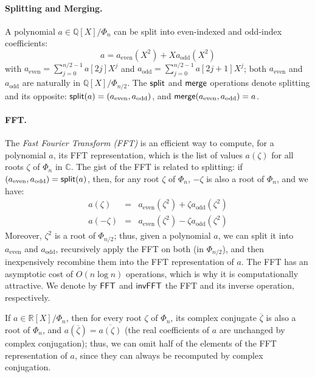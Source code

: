 \documentclass{llncs}
\newcommand{\bR}{\mathbb{R}}
\newcommand{\bQ}{\mathbb{Q}}
\newcommand{\bC}{\mathbb{C}}
\newcommand{\cconj}[1]{\overline{#1}}
\begin{document}
\paragraph{Splitting and Merging.}
A polynomial $a \in \bQ[X]/\Phi_n$ can be split into even-indexed and
odd-index coefficients:
\begin{equation*}
    a = a_{\text{even}}(X^2) + X a_{\text{odd}}(X^2)
\end{equation*}
with $a_{\text{even}} = \sum_{j=0}^{n/2-1} a[2j] X^j$ and
$a_{\text{odd}} = \sum_{j=0}^{n/2-1} a[2j+1] X^j$; both
$a_{\text{even}}$ and $a_{\text{odd}}$ are naturally in
$\bQ[X]/\Phi_{n/2}$. The $\text{\textsf{split}}$ and
$\text{\textsf{merge}}$ operations denote splitting and its opposite:
$\text{\textsf{split}}(a) = (a_{\text{even}}, a_{\text{odd}})$, and
$\text{\textsf{merge}}(a_{\text{even}}, a_{\text{odd}}) = a$.

\paragraph{FFT.}
The \emph{Fast Fourier Transform (FFT)} is an efficient way to compute,
for a polynomial $a$, its FFT representation, which is the list of
values $a(\zeta)$ for all roots $\zeta$ of $\Phi_n$ in $\bC$. The gist
of the FFT is related to splitting: if $(a_{\text{even}},
a_{\text{odd}}) = \text{\textsf{split}}(a)$, then, for any root $\zeta$
of $\Phi_n$, $-\zeta$ is also a root of $\Phi_n$, and we have:
\begin{eqnarray*}
    a(\zeta) &=& a_{\text{even}}(\zeta^2) + \zeta a_{\text{odd}}(\zeta^2) \\
    a(-\zeta) &=& a_{\text{even}}(\zeta^2) - \zeta a_{\text{odd}}(\zeta^2)
\end{eqnarray*}
Moreover, $\zeta^2$ is a root of $\Phi_{n/2}$; thus, given a polynomial
$a$, we can split it into $a_{\text{even}}$ and $a_{\text{odd}}$,
recursively apply the FFT on both (in $\Phi_{n/2}$), and then
inexpensively recombine them into the FFT representation of $a$. The FFT
has an asymptotic cost of $O(n \log n)$ operations, which is why it is
computationally attractive. We denote by $\text{\textsf{FFT}}$ and
$\text{\textsf{invFFT}}$ the FFT and its inverse operation,
respectively.

If $a\in\bR[X]/\Phi_n$, then for every root $\zeta$ of $\Phi_n$, its
complex conjugate $\cconj{\zeta}$ is also a root of $\Phi_n$, and
$a(\cconj{\zeta}) = \cconj{a(\zeta)}$ (the real coefficients of $a$ are
unchanged by complex conjugation); thus, we can omit half of the
elements of the FFT representation of $a$, since they can always be
recomputed by complex conjugation.
\end{document}

